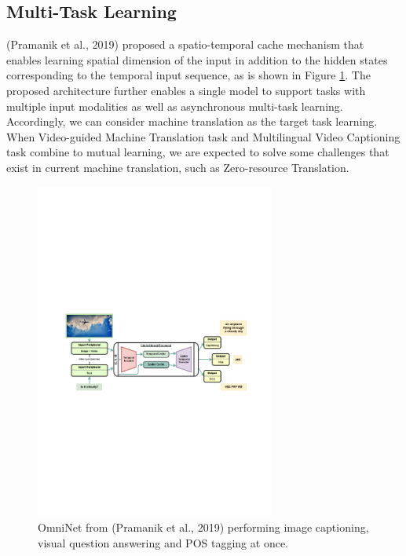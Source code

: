 \documentclass{article}
\begin{document}
\subsection{Multi-Task Learning}

(Pramanik et al., 2019) \cite{pramanik2019omninet} proposed a spatio-temporal cache mechanism that enables learning spatial dimension of the input in addition to the hidden states corresponding to the temporal input sequence, as is shown in Figure \ref{Fig.main4}. The proposed architecture further enables a single model to support tasks with multiple input modalities as well as asynchronous multi-task learning. Accordingly, we can consider machine translation as the target task learning. When Video-guided Machine Translation task and  Multilingual Video Captioning task combine to mutual learning, we are expected to solve some challenges that exist in current machine translation, such as Zero-resource Translation.


	\begin{figure}[htbp] 
		\centering
		\includegraphics[width=0.7\textwidth]{OmniNet.pdf} 
		\caption{OmniNet from (Pramanik et al., 2019) \cite{pramanik2019omninet} performing image captioning, visual question answering and POS tagging at once.}
		\label{Fig.main4} 
	\end{figure}
\end{document}
